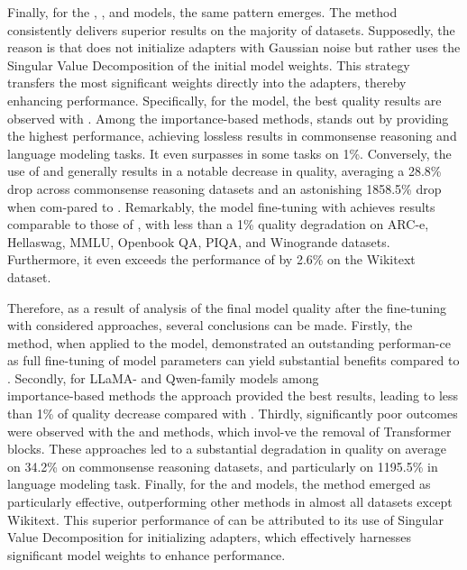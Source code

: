 Finally, for the \qwenSmall{}, \qwenMedium{}, and \qwenLarge{}  models, the same pattern emerges. The \pissa{} method consistently delivers superior results on the majority of datasets. Supposedly, the reason is that \pissa{} does not initialize adapters with Gaussian noise but rather uses the Singular Value Decomposition of the initial model weights. This strategy transfers the most significant weights directly into the \lora{} adapters, thereby enhancing performance. Specifically, for the \qwenMedium{} model, the best quality results are observed with \adalora{}. Among the importance-based methods, \uidl{} stands out by providing the highest performance, achieving lossless results in commonsense reasoning and language modeling tasks. It even surpasses \pissa{} in some tasks on 1\%. Conversely, the use of \sleb{} and \shortllama{} generally results in a notable decrease in quality, averaging a 28.8\% drop across commonsense reasoning datasets and an astonishing 1858.5\% drop when com-pared to \lora{}. Remarkably, the \qwenSmall{} model fine-tuning with \shortllama{} achieves results comparable to those of \uidl{}, with less than a 1\% quality degradation on ARC-e, Hellaswag, MMLU, Openbook QA, PIQA, and Winogrande datasets. Furthermore, it even exceeds the performance of \lora{} by 2.6\% on the Wikitext dataset.

Therefore, as a result of analysis of the final model quality after the fine-tuning with considered approaches, several conclusions can be made. Firstly, the \lisa{} method, when applied to the \gpt{} model, demonstrated an outstanding performan-ce as full fine-tuning of model parameters can yield substantial benefits compared to \lora{}. Secondly, for LLaMA- and Qwen-family models among \\ importance-based methods the \uidl{} approach provided the best results, leading to less than 1\% of quality decrease compared with \lora{}. Thirdly, significantly poor outcomes were observed with the \sleb{} and \shortllama{} methods, which invol-ve the removal of Transformer blocks. These approaches led to a substantial degradation in quality on average on 34.2\% on commonsense reasoning datasets, and particularly on 1195.5\% in language modeling task. Finally, for the \llamaTwoSmall{} and \llamaTwoBig{} models, the \pissa{} method emerged as particularly effective, outperforming other methods in almost all datasets except Wikitext. This superior performance of \pissa{} can be attributed to its use of Singular Value Decomposition for initializing adapters, which effectively harnesses significant model weights to enhance performance.

